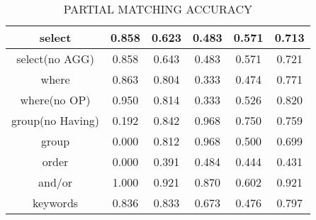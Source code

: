 



\begin{table}[h!]
    \centering
    \begin{tabular}{|c|c|c|c|c|c|}
        \hline
        select           & 0.858 & 0.623 & 0.483 & 0.571 & 0.713 \\ \hline
        select(no AGG)   & 0.858 & 0.643 & 0.483 & 0.571 & 0.721 \\ \hline
        where            & 0.863 & 0.804 & 0.333 & 0.474 & 0.771 \\ \hline
        where(no OP)     & 0.950 & 0.814 & 0.333 & 0.526 & 0.820 \\ \hline
        group(no Having) & 0.192 & 0.842 & 0.968 & 0.750 & 0.759 \\ \hline
        group            & 0.000 & 0.812 & 0.968 & 0.500 & 0.699 \\ \hline
        order            & 0.000 & 0.391 & 0.484 & 0.444 & 0.431 \\ \hline
        and/or           & 1.000 & 0.921 & 0.870 & 0.602 & 0.921 \\ \hline

        keywords         & 0.836 & 0.833 & 0.673 & 0.476 & 0.797 \\ \hline
    \end{tabular}
    \caption{PARTIAL MATCHING ACCURACY}

\end{table}
